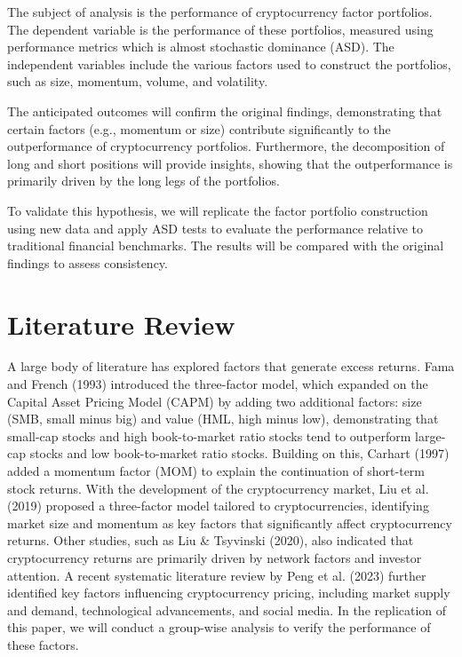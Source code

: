 \documentclass{article}
\begin{document}
The subject of analysis is the performance of cryptocurrency factor portfolios. The dependent variable is the performance of these portfolios, measured using performance metrics which is almost stochastic dominance (ASD). The independent variables include the various factors used to construct the portfolios, such as size, momentum, volume, and volatility. 

The anticipated outcomes will confirm the original findings, demonstrating that certain factors (e.g., momentum or size) contribute significantly to the outperformance of cryptocurrency portfolios. Furthermore, the decomposition of long and short positions will provide insights, showing that the outperformance is primarily driven by the long legs of the portfolios.

To validate this hypothesis, we will replicate the factor portfolio construction using new data and apply ASD tests to evaluate the performance relative to traditional financial benchmarks. The results will be compared with the original findings to assess consistency.

\hypertarget{literature-review}{%
\section{Literature Review}\label{literature-review}}

A large body of literature has explored factors that generate excess returns. Fama and French (1993) introduced the three-factor model, which expanded on the Capital Asset Pricing Model (CAPM) by adding two additional factors: size (SMB, small minus big) and value (HML, high minus low), demonstrating that small-cap stocks and high book-to-market ratio stocks tend to outperform large-cap stocks and low book-to-market ratio stocks. Building on this, Carhart (1997) added a momentum factor (MOM) to explain the continuation of short-term stock returns. With the development of the cryptocurrency market, Liu et al. (2019) proposed a three-factor model tailored to cryptocurrencies, identifying market size and momentum as key factors that significantly affect cryptocurrency returns. Other studies, such as Liu \& Tsyvinski (2020), also indicated that cryptocurrency returns are primarily driven by network factors and investor attention. A recent systematic literature review by Peng et al. (2023) further identified key factors influencing cryptocurrency pricing, including market supply and demand, technological advancements, and social media. In the replication of this paper, we will conduct a group-wise analysis to verify the performance of these factors.
\end{document}
